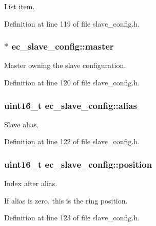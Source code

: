 List item. 



Definition at line 119 of file slave\-\_\-config.\-h.

\subsubsection[{master}]{$\ast$ ec\-\_\-slave\-\_\-config\-::master}\label{structec__slave__config_ac5bef8d37047b658df7b56f7ebdbfecb}


Master owning the slave configuration. 



Definition at line 120 of file slave\-\_\-config.\-h.

\subsubsection[{alias}]{\setlength{\rightskip}{0pt plus 5cm}uint16\-\_\-t ec\-\_\-slave\-\_\-config\-::alias}\label{structec__slave__config_a62dbce2ad4cf9367261c293534d0730c}


Slave alias. 



Definition at line 122 of file slave\-\_\-config.\-h.

\subsubsection[{position}]{\setlength{\rightskip}{0pt plus 5cm}uint16\-\_\-t ec\-\_\-slave\-\_\-config\-::position}\label{structec__slave__config_adf5176b65d59852f91125066b6bf3f07}


Index after alias. 

If alias is zero, this is the ring position. 

Definition at line 123 of file slave\-\_\-config.\-h.

